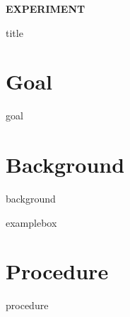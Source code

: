 \documentclass[cover.tex]{subfiles}
\newcommand\chapterlabel{../Ch-acidbase/LAB-titration-curve}
\begin{document}
 \begin{refsection}


\hfill\vspace{0.2cm}\begin{center}{\large \bfseries EXPERIMENT \par\Huge
 {title}
 \\[5pt] \par}\vspace{0.2cm}\end{center}\par\noindent
 
 
\section*{Goal}
 {goal}
 
\section*{Background}
 {background}


{examplebox}
\printbibliography[heading=subbibliography]
\section*{Procedure}
{procedure}






\end{refsection}
\end{document}
